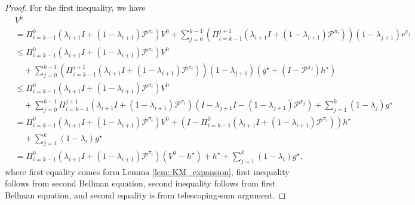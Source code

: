 \documentclass{article} %
\newcommand{\cP}{\mathcal{P}}
\newcommand*{\para}[1]{\left({#1}\right)}
\begin{document}
\begin{proof}
For the first inequality, we have
\begin{align*}
    &V^k 
    \\&=\Pi^{0}_{i=k-1}(\lambda_{i+1}I+(1-\lambda_{i+1}) \cP^{\pi_i}) V^0+ \sum^{k-1}_{j=0}\para{\Pi_{i=k-1}^{j+1}(\lambda_{i+1}I+(1-\lambda_{i+1}) \cP^{\pi_i})}(1-\lambda_{j+1}) r^{\pi_j}\\& \le  \Pi^{0}_{i=k-1}(\lambda_{i+1}I+(1-\lambda_{i+1}) \cP^{\pi_i}) V^0\\& \quad + \sum^{k-1}_{j=0}\para{\Pi_{i=k-1}^{j+1}(\lambda_{i+1}I+(1-\lambda_{i+1}) \cP^{\pi_i})}(1-\lambda_{j+1}) (g^{\star}+(I-\cP^{\pi_{j}})h^{\star}) \\& \le \Pi^{0}_{i=k-1}(\lambda_{i+1}I+(1-\lambda_{i+1}) \cP^{\pi_i}) V^0\\& \quad + \sum^{k-1}_{j=0}\Pi_{i=k-1}^{j+1}(\lambda_{i+1}I+(1-\lambda_{i+1}) \cP^{\pi_i}) (I-\lambda_{j+1} I-(1-\lambda_{j+1})\cP^{\pi_{j}}) +\sum^{k}_{j=1} (1-\lambda_{j})g^{\star}\\& =\Pi^{0}_{i=k-1}(\lambda_{i+1}I+(1-\lambda_{i+1}) \cP^{\pi_i}) V^0+(I-\Pi_{i=k-1}^{0}(\lambda_{i+1}I+(1-\lambda_{i+1}) \cP^{\pi_i}))h^{\star}\\& \quad + \sum^{k}_{j=1} (1-\lambda_{i})g^{\star}\\& =\Pi^{0}_{i=k-1}(\lambda_{i+1}I+(1-\lambda_{i+1}) \cP^{\pi_i}) (V^0-h^{\star})+h^{\star} + \sum^{k}_{j=1} (1-\lambda_{i})g^{\star},
\end{align*}
where first equality comes form Lemma \ref{lem::KM_expansion}, first inequality follows from second Bellman equation, second inequality follows from first Bellman equation, and second equality is from telescoping-sum argument. 


\end{proof}
\end{document}
